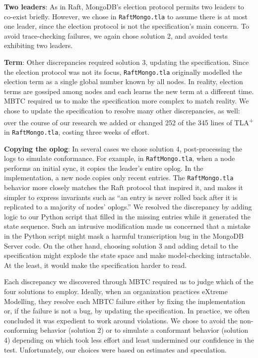 \documentclass{vldb}
\begin{document}
\textbf{Two leaders}: As in Raft, MongoDB's election protocol permits two leaders to co-exist briefly.
However, we chose in \texttt{RaftMongo.tla} to assume there is at most one leader, since the election protocol is not the specification's main concern.
To avoid trace-checking failures, we again chose solution 2, and avoided tests exhibiting two leaders.

\textbf{Term}: Other discrepancies required solution 3, updating the specification. 
Since the election protocol was not its focus, \texttt{RaftMongo.tla} originally modelled the election term as a single global number known by all nodes.
In reality, election terms are gossiped among nodes and each learns the new term at a different time.
MBTC required us to make the specification more complex to match reality. 
We chose to update the specification to resolve many other discrepancies, as well: over the course of our research we added or changed 252 of the 345 lines of TLA\textsuperscript{+} in \texttt{RaftMongo.tla}, costing three weeks of effort.

\textbf{Copying the oplog}: In several cases we chose solution 4, post-processing the logs to simulate conformance. For example, in \texttt{RaftMongo.tla}, when a node performs an initial sync, it copies the leader's entire oplog.
In the implementation, a new node copies only recent entries.
The \texttt{RaftMongo.tla} behavior more closely matches the Raft protocol that inspired it, and makes it simpler to express invariants such as ``an entry is never rolled back after it is replicated to a majority of nodes' oplogs.''
We resolved the discrepancy by adding logic to our Python script that filled in the missing entries while it generated the state sequence.
Such an intrusive modification made us concerned that a mistake in the Python script might mask a harmful transcription bug in the MongoDB Server code.
On the other hand, choosing solution 3 and adding detail to the specification might explode the state space and make model-checking intractable.
At the least, it would make the specification harder to read.

Each discrepancy we discovered through MBTC required us to judge which of the four solutions to employ. 
Ideally, when an organization practices eXtreme Modelling, they resolve each MBTC failure either by fixing the implementation or, if the failure is not a bug, by updating the specification.
In practice, we often concluded it was expedient to work around violations.
We chose to avoid the non-conforming behavior (solution 2) or to simulate a conformant behavior (solution 4) depending on which took less effort and least undermined our confidence in the test.
Unfortunately, our choices were based on estimates and speculation.
\end{document}
